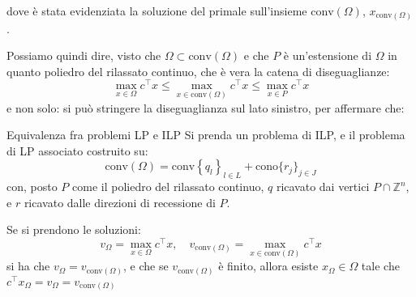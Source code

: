 \documentclass[a4paper,11pt]{article}
\begin{document}
\begin{center}


\end{center}

dove è stata evidenziata la soluzione del primale sull'insieme $\mathrm{conv}(\Omega)$, $x_{\mathrm{conv}(\Omega)}$.

Possiamo quindi dire, visto che $\Omega \subset \mathrm{conv}(\Omega)$ e che $P$ è un'estensione di $\Omega$ in quanto poliedro del rilassato continuo, che è vera la catena di diseguaglianze:
$$
\max_{x \in \Omega} c^\intercal x \leq \max_{x \in \mathrm{conv}(\Omega)} c^\intercal x \leq \max_{x \in P} c^\intercal x
$$
e non solo: si può stringere la diseguaglianza sul lato sinistro, per affermare che:
\begin{theorem}{Equivalenza fra problemi LP e ILP}
	Si prenda un problema di ILP, e il problema di LP associato costruito su:
$$
\mathrm{conv}(\Omega) = \mathrm{conv} \left\{ q_l \right\}_{l \in L} + \mathrm{cono} \{ r_j \}_{j \in J}
$$
con, posto $P$ come il poliedro del rilassato continuo, $q$ ricavato dai vertici $P \cap \mathbb{Z}^n$, e $r$ ricavato dalle direzioni di recessione di $P$. 

Se si prendono le soluzioni:
$$ v_\Omega = \max_{x \in \Omega} c^\intercal x, \quad v_{\mathrm{conv}(\Omega)} = \max_{x \in \mathrm{conv}(\Omega)} c^\intercal x$$
si ha che $v_\Omega = v_{\mathrm{conv}(\Omega)}$, e che se $v_{\mathrm{conv}(\Omega)}$ è finito, allora esiste $x_\Omega \in \Omega$ tale che $c^\intercal x_\Omega = v_\Omega = v_{\mathrm{conv}(\Omega)}$
\end{theorem}
\end{document}
